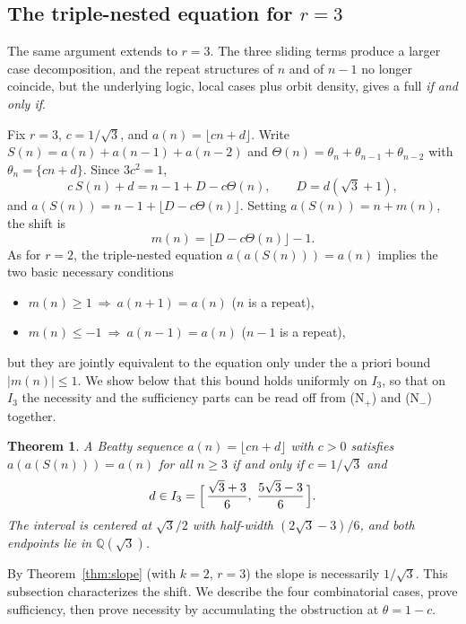 \documentclass{birkjour}
\newtheorem{theorem}{Theorem}
\theoremstyle{definition}
\theoremstyle{remark}
\newcommand{\fl}[1]{\lfloor #1 \rfloor}
\newcommand{\frc}[1]{\{ #1 \}}
\begin{document}
\subsection{The triple-nested equation for \texorpdfstring{$r=3$}{r=3}}
\label{sec:interval_r3}

The same argument extends to $r=3$. The three
sliding terms produce a larger case decomposition,
and the repeat structures of $n$ and of $n-1$ no
longer coincide, but the underlying logic, local
cases plus orbit density, gives a full
\emph{if and only if}.

Fix $r=3$, $c=1/\!\sqrt{3}$, and
$a(n)=\fl{cn+d}$. Write
$S(n)=a(n)+a(n{-}1)+a(n{-}2)$ and
$\Theta(n)=\theta_{n}+\theta_{n-1}+\theta_{n-2}$
with $\theta_{n}=\frc{cn+d}$. Since $3c^{2}=1$,
\begin{equation*}  c\,S(n)+d=n-1+D-c\Theta(n),\qquad
  D=d(\sqrt{3}+1),
\end{equation*}
and $a(S(n))=n-1+\fl{D-c\Theta(n)}$. Setting
$a(S(n))=n+m(n)$, the shift is
\begin{equation}\label{eq:m_r3}
  m(n)=\fl{D-c\Theta(n)}-1.
\end{equation}
As for $r=2$, the triple-nested equation
$a(a(S(n)))=a(n)$ implies the two basic necessary
conditions
\begin{itemize}
\item[(N$_{+}$)] $m(n)\ge 1\ \Rightarrow\ a(n+1)=a(n)$
($n$ is a repeat),
\item[(N$_{-}$)] $m(n)\le -1\ \Rightarrow\ a(n-1)=a(n)$
($n-1$ is a repeat),
\end{itemize}
but they are jointly equivalent to the equation only
under the a priori bound $|m(n)|\le 1$. We show
below that this bound holds uniformly on $I_{3}$,
so that on $I_{3}$ the necessity and the
sufficiency parts can be read off from
(N$_{+}$) and (N$_{-}$) together.

\begin{theorem}\label{thm:interval_r3}
A Beatty sequence $a(n)=\fl{cn+d}$ with $c>0$ satisfies
$a(a(S(n)))=a(n)$ for all $n\ge 3$ if and only if
$c=1/\!\sqrt{3}$ and
\begin{equation*}  d\in I_{3}=\Bigl[\,\frac{\sqrt{3}+3}{6},\;
  \frac{5\sqrt{3}-3}{6}\,\Bigr].
\end{equation*}
The interval is centered at $\sqrt{3}/2$ with half-width
$(2\sqrt{3}-3)/6$, and both endpoints lie in
$\mathbb{Q}(\sqrt{3})$.
\end{theorem}

By Theorem~\ref{thm:slope} (with $k=2$, $r=3$) the slope is
necessarily $1/\!\sqrt{3}$. This subsection characterizes the
shift. We describe the four
combinatorial cases, prove sufficiency, then prove necessity
by accumulating the obstruction at $\theta=1-c$.
\end{document}
